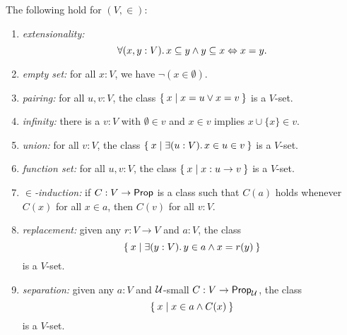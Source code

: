 \begin{thm}\label{thm:VisCST}
  The following hold for $(V, {\in})$:
  \begin{enumerate}
  \item \emph{extensionality:}
    \begin{equation*}
      \fall{x, y : V} x \subseteq y \land y \subseteq x \Leftrightarrow x = y.
    \end{equation*}
     \item \emph{empty set:} for all $x:V$, we have $\neg (x\in \emptyset)$.
    \item \emph{pairing:} for all $u, v:V$, the class $\Set{ x | x = u \vee x = v}$ is a $V$-set.
    \item \emph{infinity:} there is a $v:V$ with $\emptyset\in v$ and $x\in v$ implies $x\cup \{x\}\in v$.
  \item \emph{union:} for all $v:V$, the class $\setof{ x | \exis{u:V} x \in u \in v}$ is a $V$-set.
    \item \emph{function set:} for all $u, v:V$, the class $\Set{ x | x : u\to v}$ is a $V$-set.
   \item \emph{$\in$-induction:} if $C : V \to \mathsf{Prop}$ is a class such that $C(a)$ holds whenever $C(x)$ for all $x\in a$, then $C(v)$ for all $v:V$.
     \item \emph{replacement:} given any $r : V \to V$ and $a : V$, the class 
       \begin{equation*}
         \setof{ x | \exis{y : V} y \in a \land x = r(y)}
       \end{equation*}
       is a $V$-set.
   \item \emph{separation:} given any $a : V$ and $\mathcal{U}$-small $C : V \to \mathsf{Prop}_\mathcal{U}$, the class
     \begin{equation*}
       \Set{ x | x \in a \land C(x)}
     \end{equation*}
     is a $V$-set.
  \end{enumerate}
\end{thm}


